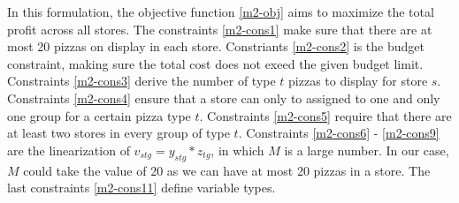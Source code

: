 \documentclass[a4, 11pt]{article}
\begin{document}
In this formulation, the objective function \eqref{m2-obj} aims to maximize the total profit across all stores.
The constraints \eqref{m2-cons1} make sure that there are at most 20 pizzas on display in each store.
Constriants \eqref{m2-cons2} is the budget constraint, making sure the total cost does not exeed the given budget limit.
Constraints \eqref{m2-cons3} derive the number of type $t$ pizzas to display for store $s$.
Constraints \eqref{m2-cons4} ensure that a store can only to assigned to one and only one group for a certain pizza type $t$.
Constraints \eqref{m2-cons5} require that there are at least two stores in every group of type $t$.
Constraints \eqref{m2-cons6} - \eqref{m2-cons9} are the linearization of $v_{stg} = y_{stg} * z_{tg}$, in which $M$ is a large number.
In our case, $M$ could take the value of 20 as we can have at most 20 pizzas in a store.
The last constraints \eqref{m2-cons11} define variable types.
	
\end{document}
